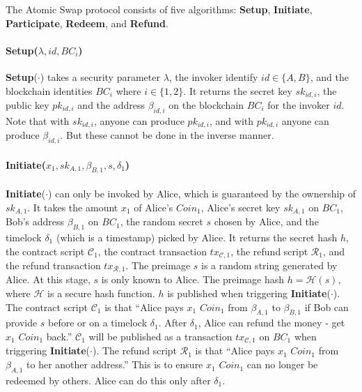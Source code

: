 The Atomic Swap protocol consists of five algorithms:
\textbf{Setup},
\textbf{Initiate},
\textbf{Participate},
\textbf{Redeem}, and
\textbf{Refund}.


\paragraph{\textbf{Setup}($\lambda, id, BC_i$)}
\textbf{Setup}($\cdot$) takes a security parameter $\lambda$,
the invoker identify $id \in \{A, B\}$,
and the blockchain identities $BC_i$ where $i \in \{1, 2\}$.
It returns the secret key $sk_{id, i}$, the public key $pk_{id, i}$ and the address $\beta_{id, i}$ on the blockchain $BC_i$ for the invoker $id$.
Note that with $sk_{id, i}$, anyone can produce $pk_{id, i}$, and with $pk_{id, i}$ anyone can produce $\beta_{id, i}$. But these cannot be done in the inverse manner.

\paragraph{\textbf{Initiate}($x_1, sk_{A, 1}, \beta_{B, 1}, s, \delta_1$)}
\textbf{Initiate}($\cdot$) can only be invoked by Alice, which is guaranteed by the ownership of $sk_{A, 1}$.
It takes the amount $x_1$ of Alice's $Coin_1$,
Alice's secret key $sk_{A, 1}$ on $BC_1$,
Bob's address $\beta_{B, 1}$ on $BC_1$,
the random secret $s$ chosen by Alice,
and the timelock $\delta_1$ (which is a timestamp) picked by Alice.
It returns the secret hash $h$,
the contract script $\mathcal{C}_1$,
the contract transaction $tx_{\mathcal{C}, 1}$,
the refund script $\mathcal{R}_1$,
and the refund transaction $tx_{\mathcal{R}, 1}$.
The preimage $s$ is a random string generated by Alice. At this stage, $s$ is only known to Alice.
The preimage hash $h = \mathcal{H}(s)$, where $\mathcal{H}$ is a secure hash function.
$h$ is published when triggering \textbf{Initiate}($\cdot$).
The contract script $\mathcal{C}_1$ is that ``Alice pays $x_1$ $Coin_1$ from $\beta_{A, 1}$ to $\beta_{B, 1}$ if Bob can provide $s$ before or on a timelock $\delta_1$. After $\delta_1$, Alice can refund the money - get $x_1$ $Coin_1$ back.''
$\mathcal{C}_1$ will be published as a transaction $tx_{\mathcal{C}, 1}$ on $BC_1$ when triggering \textbf{Initiate}($\cdot$).
The refund script $\mathcal{R}_1$ is that ``Alice pays $x_1$ $Coin_1$ from $\beta_{A, 1}$ to her another address.'' This is to ensure $x_1$ $Coin_1$ can no longer be redeemed by others. Alice can do this only after $\delta_1$.

